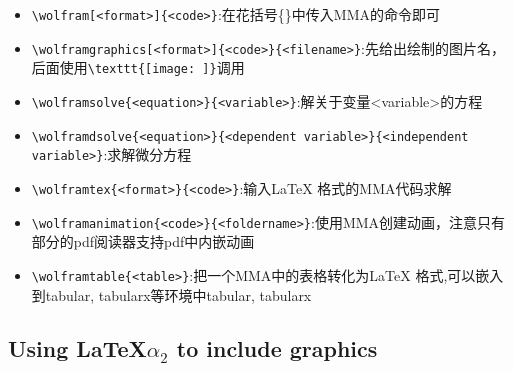 \documentclass[12pt]{article}
\begin{document}
\begin{framed}
\begin{itemize}
    \item \verb|\wolfram[<format>]{<code>}|:在花括号\{\}中传入MMA的命令即可
    \item \verb|\wolframgraphics[<format>]{<code>}{<filename>}|:先给出绘制的图片名，后面使用\verb|\texttt{[image: ]}|调用
    \item \verb|\wolframsolve{<equation>}{<variable>}|:解关于变量<variable>的方程
    \item \verb|\wolframdsolve{<equation>}{<dependent variable>}{<independent variable>}|:求解微分方程
    \item \verb|\wolframtex{<format>}{<code>}|:输入\LaTeX{} 格式的MMA代码求解
    \item \verb|\wolframanimation{<code>}{<foldername>}|:使用MMA创建动画，注意只有部分的pdf阅读器支持pdf中内嵌动画
    \item \verb|\wolframtable{<table>}|:把一个MMA中的表格转化为\LaTeX{} 格式,可以嵌入到{\ttfamily tabular, tabularx}等环境中\ttfamily tabular, tabularx
\end{itemize}
\end{framed}

\subsection{Using \LaTeX $\alpha_2$ to include graphics}
\end{document}
